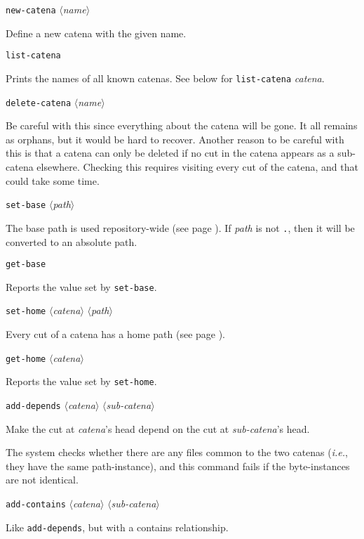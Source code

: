 \documentclass[10pt]{article}
\newcommand{\dotpath}{{\tt\textquotesingle.\textquotesingle}}
\newcommand{\itarg}[1]{\textit{$\langle$#1$\rangle$}}
\begin{document}
{{\tt new-catena} \itarg{name}
\begin{hang}
Define a new catena with the given name.
\end{hang}

{\tt list-catena}
\begin{hang}
Prints the names of all known catenas. See below for
{\tt list-catena} {\it catena}.
\end{hang}

{\tt delete-catena} \itarg{name}
\begin{hang}
Be careful with this since everything about the catena will be gone. It all
remains as orphans, but it would be hard to recover. Another reason to
be careful with this is that a catena can only be deleted if no cut in
the catena appears as a sub-catena elsewhere. Checking this requires
visiting every cut of the catena, and that could take some time.
\end{hang}

{\tt set-base} \itarg{path}
\begin{hang}
The base path is used repository-wide (see page \pageref{section-paths}).
If {\it path} is not \dotpath, then it will be converted to an absolute path. 
\end{hang}

{\tt get-base}
\begin{hang}
Reports the value set by {\tt set-base}.
\end{hang}  

{\tt set-home} \itarg{catena} \itarg{path}
\begin{hang}
Every cut of a catena has a home path (see page \pageref{section-paths}). 
\end{hang}

{\tt get-home} \itarg{catena}
\begin{hang}
Reports the value set by {\tt set-home}.
\end{hang}
  
{\tt add-depends} \itarg{catena} \itarg{sub-catena}
\begin{hang}
Make the cut at {\it catena}'s head depend on the cut at
{\it sub-catena}'s head. 
  
The system checks whether there are any files common to the two catenas 
({\it i.e.}, they have the same path-instance), and this 
command fails if the byte-instances are not identical.
\end{hang}

{\tt add-contains} \itarg{catena} \itarg{sub-catena}
\begin{hang}
Like {\tt add-depends}, but with a contains relationship.


\end{hang}}
\end{document}
